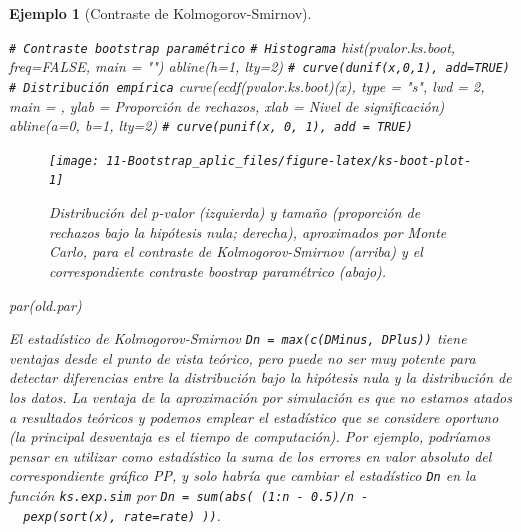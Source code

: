 \documentclass[
]{book}
\newenvironment{Shaded}{\begin{snugshade}}{\end{snugshade}}
\newcommand{\AttributeTok}[1]{\textcolor[rgb]{0.77,0.63,0.00}{#1}}
\newcommand{\CommentTok}[1]{\textcolor[rgb]{0.56,0.35,0.01}{\textit{#1}}}
\newcommand{\ConstantTok}[1]{\textcolor[rgb]{0.00,0.00,0.00}{#1}}
\newcommand{\DecValTok}[1]{\textcolor[rgb]{0.00,0.00,0.81}{#1}}
\newcommand{\FunctionTok}[1]{\textcolor[rgb]{0.00,0.00,0.00}{#1}}
\newcommand{\NormalTok}[1]{#1}
\newcommand{\StringTok}[1]{\textcolor[rgb]{0.31,0.60,0.02}{#1}}
\theoremstyle{break}
\newtheorem{example}{Ejemplo}[chapter]
\theoremstyle{nonumberplain}
\renewcommand{\CommentTok}[1]{\textcolor[rgb]{0.41,0.41,0.41}{\texttt{#1}}}
\begin{document}
\begin{example}[Contraste de Kolmogorov-Smirnov]
\begin{Shaded}
\begin{Highlighting}[]
\CommentTok{\# Contraste bootstrap paramétrico}
  \CommentTok{\# Histograma}
\FunctionTok{hist}\NormalTok{(pvalor.ks.boot, }\AttributeTok{freq=}\ConstantTok{FALSE}\NormalTok{, }\AttributeTok{main =} \StringTok{""}\NormalTok{)}
\FunctionTok{abline}\NormalTok{(}\AttributeTok{h=}\DecValTok{1}\NormalTok{, }\AttributeTok{lty=}\DecValTok{2}\NormalTok{)   }\CommentTok{\# curve(dunif(x,0,1), add=TRUE)}
  \CommentTok{\# Distribución empírica}
\FunctionTok{curve}\NormalTok{(}\FunctionTok{ecdf}\NormalTok{(pvalor.ks.boot)(x), }\AttributeTok{type =} \StringTok{"s"}\NormalTok{, }\AttributeTok{lwd =} \DecValTok{2}\NormalTok{, }\AttributeTok{main =} \StringTok{\textquotesingle{}\textquotesingle{}}\NormalTok{, }
      \AttributeTok{ylab =} \StringTok{\textquotesingle{}Proporción de rechazos\textquotesingle{}}\NormalTok{,  }\AttributeTok{xlab =} \StringTok{\textquotesingle{}Nivel de significación\textquotesingle{}}\NormalTok{)}
\FunctionTok{abline}\NormalTok{(}\AttributeTok{a=}\DecValTok{0}\NormalTok{, }\AttributeTok{b=}\DecValTok{1}\NormalTok{, }\AttributeTok{lty=}\DecValTok{2}\NormalTok{)   }\CommentTok{\# curve(punif(x, 0, 1), add = TRUE)}
\end{Highlighting}
\end{Shaded}

\begin{figure}[!htb]

{\centering \texttt{[image: 11-Bootstrap\_aplic\_files/figure-latex/ks-boot-plot-1]} 

}

\caption{Distribución del p-valor (izquierda) y tamaño (proporción de rechazos bajo la hipótesis nula; derecha), aproximados por  Monte Carlo, para el contraste de Kolmogorov-Smirnov (arriba) y el correspondiente contraste boostrap paramétrico (abajo).}\label{fig:ks-boot-plot}
\end{figure}

\begin{Shaded}
\begin{Highlighting}[]
\FunctionTok{par}\NormalTok{(old.par)}
\end{Highlighting}
\end{Shaded}

El estadístico de Kolmogorov-Smirnov \texttt{Dn\ =\ max(c(DMinus,\ DPlus))} tiene ventajas desde el
punto de vista teórico, pero puede no ser muy potente para detectar diferencias entre la
distribución bajo la hipótesis nula y la distribución de los datos.
La ventaja de la aproximación por simulación es que no estamos atados a resultados teóricos
y podemos emplear el estadístico que se considere oportuno
(la principal desventaja es el tiempo de computación).
Por ejemplo, podríamos pensar en utilizar como estadístico la suma de los errores en
valor absoluto del correspondiente gráfico PP, y solo habría que cambiar el estadístico
\texttt{Dn} en la función \texttt{ks.exp.sim} por \texttt{Dn\ =\ sum(abs(\ (1:n\ -\ 0.5)/n\ -\ \ pexp(sort(x),\ rate=rate)\ ))}.
\end{example}
\end{document}
